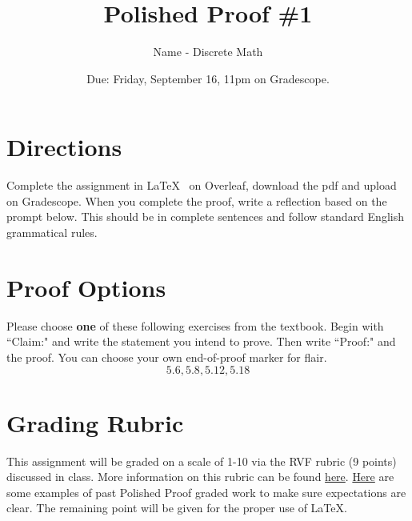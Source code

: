 \documentclass[10pt, leqno]{article}
\title{Polished Proof \#1}
\author{Name - Discrete Math}
\date{Due: Friday, September 16, 11pm on Gradescope.}
\begin{document}
	
\maketitle
	
\section*{Directions}
	
Complete the assignment in \LaTeX ~ on Overleaf, download the pdf and upload on Gradescope. When you complete the proof, write a reflection based on the prompt below. This should be in complete sentences and follow standard English grammatical rules.

	
\section*{Proof Options}
	
Please choose \textbf{one} of these following exercises from the textbook. Begin with ``Claim:" and write the statement you intend to prove. Then write ``Proof:" and the proof. You can choose your own end-of-proof marker for flair. 	
$$ 	5.6, 5.8, 5.12, 5.18 $$ 
	
	
\section*{Grading Rubric}
This assignment will be graded on a scale of 1-10 via the RVF rubric (9 points) discussed in class. More information on this rubric can be found \href{https://drive.google.com/file/d/1P0OBjw-GkX64uCpYcqYmXARapf9MwaiI/view?usp=sharing}{here}. \href{https://drive.google.com/file/d/1KAFQ7GBFpfUkyTBRZ30h5o6nXWwYDSML/view?usp=sharing}{Here} are some examples of past Polished Proof graded work to make sure expectations are clear. The remaining point will be given for the proper use of \LaTeX.
	
\end{document}
